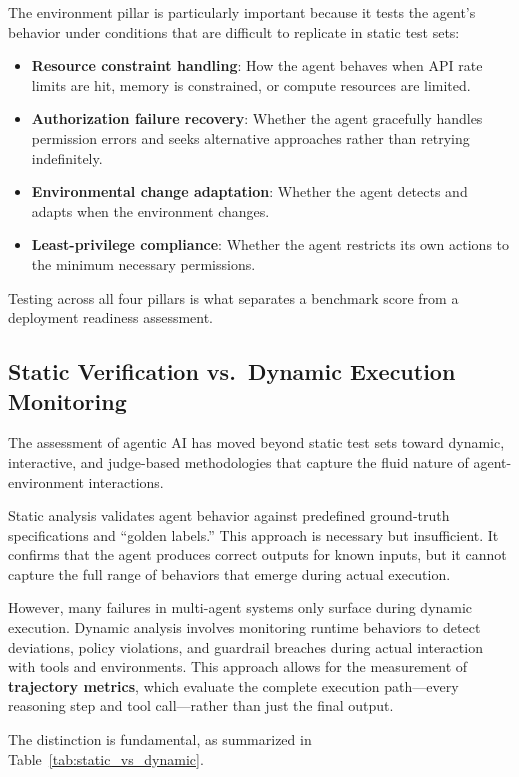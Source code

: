 \documentclass[11pt]{article}
\newcommand{\keyword}[1]{\textbf{#1}}
\begin{document}
The environment pillar is particularly important because it tests the agent's behavior under conditions that are difficult to replicate in static test sets:
\begin{itemize}
    \item \textbf{Resource constraint handling}: How the agent behaves when API rate limits are hit, memory is constrained, or compute resources are limited.
    \item \textbf{Authorization failure recovery}: Whether the agent gracefully handles permission errors and seeks alternative approaches rather than retrying indefinitely.
    \item \textbf{Environmental change adaptation}: Whether the agent detects and adapts when the environment changes.
    \item \textbf{Least-privilege compliance}: Whether the agent restricts its own actions to the minimum necessary permissions.
\end{itemize}

Testing across all four pillars is what separates a benchmark score from a deployment readiness assessment.

\subsection{Static Verification vs.\ Dynamic Execution Monitoring}

The assessment of agentic AI has moved beyond static test sets toward dynamic, interactive, and judge-based methodologies that capture the fluid nature of agent-environment interactions.

Static analysis validates agent behavior against predefined ground-truth specifications and ``golden labels.'' This approach is necessary but insufficient. It confirms that the agent produces correct outputs for known inputs, but it cannot capture the full range of behaviors that emerge during actual execution.

However, many failures in multi-agent systems only surface during dynamic execution. Dynamic analysis involves monitoring runtime behaviors to detect deviations, policy violations, and guardrail breaches during actual interaction with tools and environments. This approach allows for the measurement of \keyword{trajectory metrics}, which evaluate the complete execution path---every reasoning step and tool call---rather than just the final output.

The distinction is fundamental, as summarized in Table~\ref{tab:static_vs_dynamic}.
\end{document}
